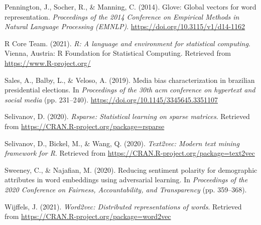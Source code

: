 \documentclass[english,man]{apa6}
\begin{document}
\leavevmode\hypertarget{ref-pennington:2014:G}{}%
Pennington, J., Socher, R., \& Manning, C. (2014). Glove: Global vectors for word representation. \emph{Proceedings of the 2014 Conference on Empirical Methods in Natural Language Processing (EMNLP)}. \url{https://doi.org/10.3115/v1/d14-1162}

\leavevmode\hypertarget{ref-rcore}{}%
R Core Team. (2021). \emph{R: A language and environment for statistical computing}. Vienna, Austria: R Foundation for Statistical Computing. Retrieved from \url{https://www.R-project.org/}

\leavevmode\hypertarget{ref-sales2019media}{}%
Sales, A., Balby, L., \& Veloso, A. (2019). Media bias characterization in brazilian presidential elections. In \emph{Proceedings of the 30th acm conference on hypertext and social media} (pp. 231--240). \url{https://doi.org/10.1145/3345645.3351107}

\leavevmode\hypertarget{ref-rsparse}{}%
Selivanov, D. (2020). \emph{Rsparse: Statistical learning on sparse matrices}. Retrieved from \url{https://CRAN.R-project.org/package=rsparse}

\leavevmode\hypertarget{ref-selivanov2020tex2vec}{}%
Selivanov, D., Bickel, M., \& Wang, Q. (2020). \emph{Text2vec: Modern text mining framework for R}. Retrieved from \url{https://CRAN.R-project.org/package=text2vec}

\leavevmode\hypertarget{ref-sweeney2020reducing}{}%
Sweeney, C., \& Najafian, M. (2020). Reducing sentiment polarity for demographic attributes in word embeddings using adversarial learning. In \emph{Proceedings of the 2020 Conference on Fairness, Accountability, and Transparency} (pp. 359--368).

\leavevmode\hypertarget{ref-wijffelsword2vec}{}%
Wijffels, J. (2021). \emph{Word2vec: Distributed representations of words}. Retrieved from \url{https://CRAN.R-project.org/package=word2vec}

\endgroup
\end{document}
